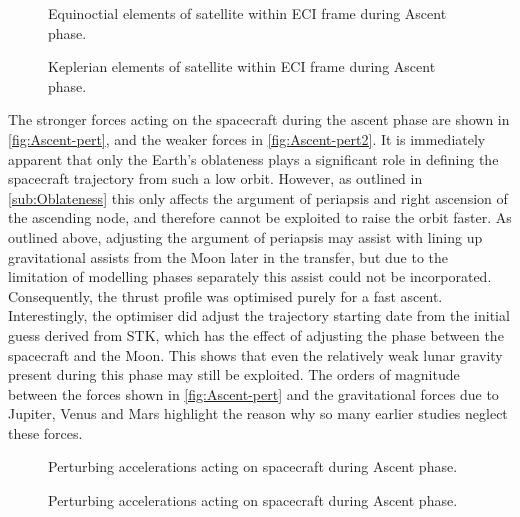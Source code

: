 \begin{figure}
\centering
\def\svgwidth{\figurewidth}

\caption{Equinoctial elements of satellite within ECI frame during Ascent phase.}
\label{fig:Ascent-mee}
\end{figure}

\begin{figure}
\centering
\def\svgwidth{\figurewidth}

\caption{Keplerian elements of satellite within ECI frame during Ascent phase.}
\label{fig:Ascent-kep}
\end{figure}

The stronger forces acting on the spacecraft during the ascent phase are shown in \autoref{fig:Ascent-pert}, and the weaker forces in \autoref{fig:Ascent-pert2}. It is immediately apparent that only the Earth's oblateness plays a significant role in defining the spacecraft trajectory from such a low orbit. However, as outlined in \autoref{sub:Oblateness} this only affects the argument of periapsis and right ascension of the ascending node, and therefore cannot be exploited to raise the orbit faster. As outlined above, adjusting the argument of periapsis may assist with lining up gravitational assists from the Moon later in the transfer, but due to the limitation of modelling phases separately this assist could not be incorporated. Consequently, the thrust profile was optimised purely for a fast ascent. Interestingly, the optimiser did adjust the trajectory starting date from the initial guess derived from STK, which has the effect of adjusting the phase between the spacecraft and the Moon. This shows that even the relatively weak lunar gravity present during this phase may still be exploited. The orders of magnitude between the forces shown in \autoref{fig:Ascent-pert} and the gravitational forces due to Jupiter, Venus and Mars highlight the reason why so many earlier studies neglect these forces. 

\begin{figure}
\centering
\def\svgwidth{\figurewidth}

\caption{Perturbing accelerations acting on spacecraft during Ascent phase.}
\label{fig:Ascent-pert}
\end{figure}

\begin{figure}
\centering
\def\svgwidth{\figurewidth}

\caption{Perturbing accelerations acting on spacecraft during Ascent phase.}
\label{fig:Ascent-pert2}
\end{figure}

